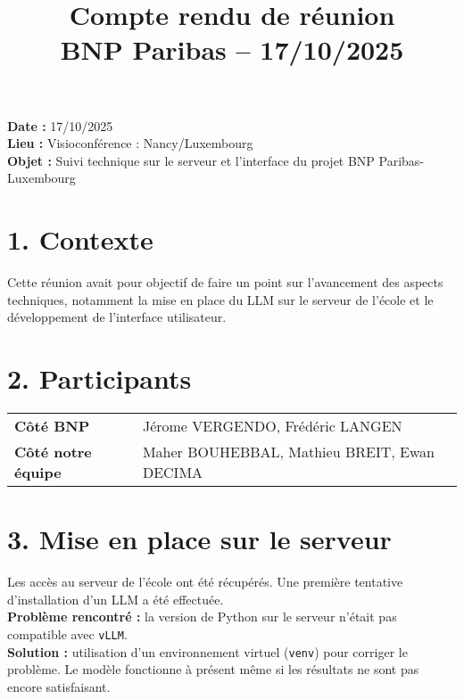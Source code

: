 \documentclass[a4paper,11pt]{article}
\title{\LARGE Compte rendu de réunion \\ \large BNP Paribas – 17/10/2025}
\date{}
\begin{document}
    \maketitle

    \begin{tcolorbox}[colback=blue!5!white,colframe=blue!75!black,title=Informations générales]
        \textbf{Date :} 17/10/2025 \\
        \textbf{Lieu :} Visioconférence : Nancy/Luxembourg \\
        \textbf{Objet :} Suivi technique sur le serveur et l’interface du projet BNP Paribas-Luxembourg
    \end{tcolorbox}

    \vspace{0.5cm}

    \section*{1. Contexte}
    Cette réunion avait pour objectif de faire un point sur l’avancement des aspects techniques, notamment la mise en place du LLM sur le serveur de l’école et le développement de l’interface utilisateur.

    \section*{2. Participants}
    \begin{tcolorbox}[colback=gray!5!white,colframe=black!75!black,title=Participants]
        \begin{tabular}{>{\bfseries}l l}
            Côté BNP & Jérome VERGENDO, Frédéric LANGEN \\
            Côté notre équipe & Maher BOUHEBBAL, Mathieu BREIT, Ewan DECIMA
        \end{tabular}
    \end{tcolorbox}

    \section*{3. Mise en place sur le serveur}
    Les accès au serveur de l’école ont été récupérés. Une première tentative d’installation d’un LLM a été effectuée. \\
    \textbf{Problème rencontré :} la version de Python sur le serveur n’était pas compatible avec \texttt{vLLM}. \\
    \textbf{Solution :} utilisation d’un environnement virtuel (\texttt{venv}) pour corriger le problème. Le modèle fonctionne à présent même si les résultats ne sont pas encore satisfaisant.
\end{document}
